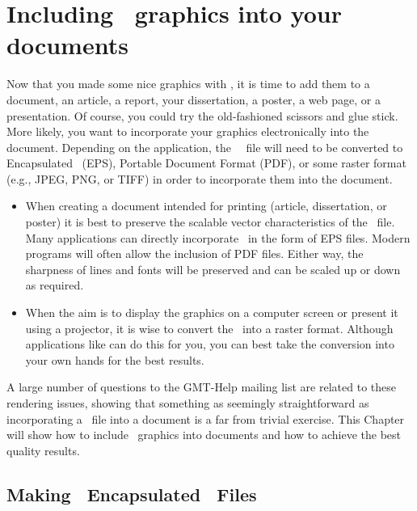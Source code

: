 %
%

\chapter{Including \gmt\ graphics into your documents}
\label{app:C}

Now that you made some nice graphics with \GMT, it is time to add them to a document, an article, a report, your dissertation, a poster, a web page, or a presentation. Of course, you could try the old-fashioned scissors and glue stick. More likely, you want to incorporate your graphics electronically into the document. Depending on the application, the \GMT\ \PS\ file will need to be converted to Encapsulated \PS\ (EPS), Portable Document Format (PDF), or some raster format (e.g., JPEG, PNG, or TIFF) in order to incorporate them into the document.
\begin{itemize}
\item When creating a document intended for printing (article, dissertation, or poster) it is best to preserve the scalable vector characteristics of the \PS\ file. Many applications can directly incorporate \PS\ in the form of EPS files. Modern programs will often allow the inclusion of PDF files. Either way, the sharpness of lines and fonts will be preserved and can be scaled up or down as required.
\item When the aim is to display the graphics on a computer screen or present it using a projector, it is wise to convert the \PS\ into a raster format. Although applications like  can do this for you, you can best take the conversion into your own hands for the best results.
\end{itemize}
A large number of questions to the GMT-Help mailing list are related to these rendering issues, showing that something as seemingly straightforward as incorporating a \PS\ file into a document is a far from trivial exercise.
This Chapter will show how to include \GMT\ graphics into documents and how to achieve the best quality results.

\section{Making \gmt\ Encapsulated \PS\ Files}
\label{sec:eps}

